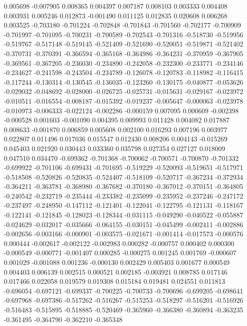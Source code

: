 0.005698
-0.007905
0.008365
0.004397
0.007187
0.008103
0.003333
0.004408
0.003931
0.005246
0.012873
-0.001490
0.011125
0.012835
0.020608
0.006268
0.003525
-0.703180
-0.701224
-0.702848
-0.701843
-0.701560
-0.702177
-0.700909
-0.701997
-0.701095
-0.700231
-0.700589
-0.702543
-0.701316
-0.518730
-0.519956
-0.519767
-0.517148
-0.519145
-0.521409
-0.521690
-0.520051
-0.519871
-0.521402
-0.370731
-0.370391
-0.366594
-0.365168
-0.364986
-0.364231
-0.370959
-0.367905
-0.369561
-0.367205
-0.236030
-0.234890
-0.242058
-0.232300
-0.233771
-0.234146
-0.234627
-0.241598
-0.243504
-0.234789
-0.126078
-0.120783
-0.118982
-0.116415
-0.117244
-0.130314
-0.130545
-0.136035
-0.123260
-0.130175
-0.040877
-0.053626
-0.029032
-0.048692
-0.028000
-0.026725
-0.025731
-0.015631
-0.029167
-0.023972
-0.010511
-0.016554
-0.008187
-0.015392
-0.019237
-0.005647
-0.000063
-0.023978
-0.010973
-0.006333
-0.022124
-0.002286
-0.000159
0.007095
0.000609
-0.002398
-0.000528
0.001603
-0.001090
0.004395
0.009993
0.011428
0.004082
0.017887
0.008633
-0.001870
0.006859
0.005608
0.002100
0.016293
0.007196
0.003977
0.022807
0.011496
0.017036
0.015547
0.012430
0.008206
0.004143
-0.015269
0.045403
0.021920
0.030443
0.033360
0.035798
0.027354
0.027127
0.018009
0.047510
0.034470
-0.699362
-0.701368
-0.700062
-0.700571
-0.700870
-0.701332
-0.699922
-0.701106
-0.699431
-0.701695
-0.519229
-0.520093
-0.519651
-0.517971
-0.518508
-0.520826
-0.520835
-0.524407
-0.518109
-0.520717
-0.367234
-0.372934
-0.364211
-0.363781
-0.368980
-0.367682
-0.370180
-0.367012
-0.370151
-0.364805
-0.240542
-0.232719
-0.235444
-0.233382
-0.235099
-0.235952
-0.237246
-0.247172
-0.237497
-0.248950
-0.147112
-0.121401
-0.122041
-0.122795
-0.121131
-0.118167
-0.122141
-0.121845
-0.128023
-0.128344
-0.031115
-0.049290
-0.040522
-0.055887
-0.024629
-0.032017
-0.035666
-0.064155
-0.030151
-0.045499
-0.002411
-0.002886
-0.002656
-0.003166
-0.000901
-0.003575
-0.021671
-0.001414
-0.017573
-0.000576
0.000444
-0.002617
-0.002122
-0.002983
0.000282
-0.000757
0.000402
0.000300
-0.000549
-0.000771
-0.001407
0.000285
-0.000275
0.001245
0.001769
-0.000607
0.001029
-0.001088
0.001236
-0.000130
0.002429
0.005403
0.001677
0.000549
0.004403
0.006139
0.002515
0.000521
0.002185
-0.003921
0.008785
0.017146
0.017466
0.022058
0.019579
0.019308
0.015184
0.019481
0.024551
0.011813
-0.696054
-0.697121
-0.699337
-0.700225
-0.700733
-0.700696
-0.699205
-0.698641
-0.697968
-0.697386
-0.517262
-0.516267
-0.515253
-0.518297
-0.516201
-0.516926
-0.516483
-0.515895
-0.518885
-0.520469
-0.365960
-0.366380
-0.360894
-0.363235
-0.361495
-0.364790
-0.362210
-0.365348
